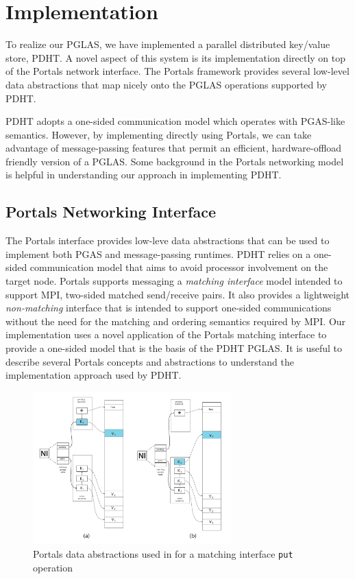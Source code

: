 \section{Implementation}

To realize our PGLAS, we have implemented a parallel distributed key/value store, 
PDHT. A novel aspect of this system is its implementation directly on top of the
Portals network interface. The Portals framework provides several low-level 
data abstractions that map nicely onto the PGLAS operations supported by PDHT.

PDHT adopts a one-sided communication model which operates 
with PGAS-like semantics. However, by implementing directly using Portals, we
can take advantage of message-passing features that permit an efficient, 
hardware-offload friendly version of a PGLAS. Some background in the Portals
networking model is helpful in understanding our approach in implementing PDHT.

\subsection{Portals Networking Interface}


The Portals interface provides low-leve data abstractions that can be used to
implement both PGAS and message-passing runtimes. PDHT relies on a one-sided
communication model that aims to avoid processor involvement on the target
node. Portals supports messaging a {\em matching interface} model intended to
support MPI, two-sided matched send/receive pairs. It also provides a
lightweight {\em non-matching} interface that is intended to support one-sided
communications without the need for the matching and ordering semantics
required by MPI. Our implementation uses a novel application of the Portals
matching interface to provide a one-sided model that is the basis of the PDHT
PGLAS. It is useful to describe several Portals concepts and abstractions to
understand the implementation approach used by PDHT.

\begin{figure}[ht]
  \centering
  \includegraphics[width=3in]{figs/put_smaller}
  \caption{Portals data abstractions used in for a matching interface {\tt put} operation}
  \label{fig:put}
\end{figure}

